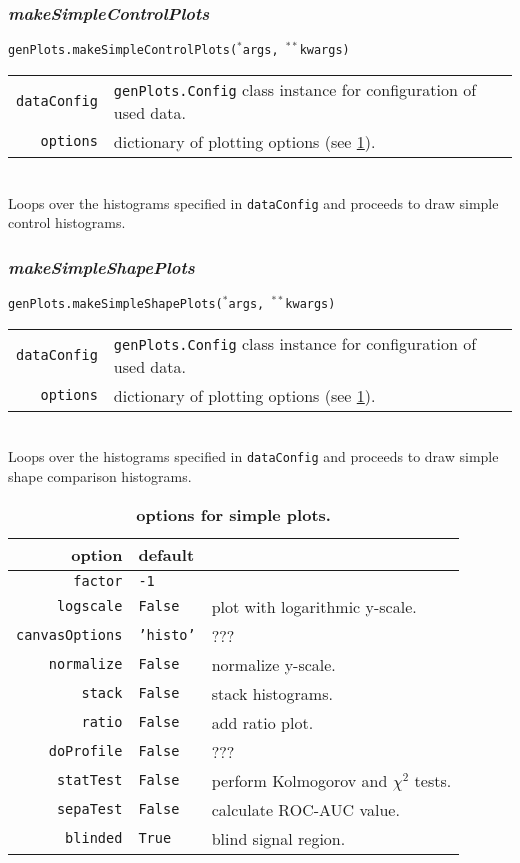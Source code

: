 \documentclass[12pt, a4paper]{article}
\newcommand{\args}{$^*$args}
\newcommand{\kwargs}{$^{**}$kwargs}
\begin{document}
\subsubsection{\textit{makeSimpleControlPlots}}
\texttt{genPlots.makeSimpleControlPlots(\args, \kwargs)}\\
\begin{tabular}{r|l}
\hline
\texttt{dataConfig}	&	\texttt{genPlots.Config} class instance for configuration of used data.\\
\texttt{options}	&	dictionary of plotting options (see \ref{plotoptionstable}).\\
\hline
\end{tabular}
\\
Loops over the histograms specified in \texttt{dataConfig} and proceeds to draw simple control histograms.

\subsubsection{\textit{makeSimpleShapePlots}}
\texttt{genPlots.makeSimpleShapePlots(\args, \kwargs)}\\
\begin{tabular}{r|l}
\hline
\texttt{dataConfig}	&	\texttt{genPlots.Config} class instance for configuration of used data.\\
\texttt{options}	&	dictionary of plotting options (see \ref{plotoptionstable}).\\
\hline
\end{tabular}
\\
Loops over the histograms specified in \texttt{dataConfig} and proceeds to draw simple shape comparison histograms.


\begin{table}
\caption{\textbf{options for simple plots.}}\label{plotoptionstable}
\begin{tabular}{r|ll}
option					& default			& 	\\
\hline
\texttt{factor}			& \texttt{-1}		&  	\\
\texttt{logscale}		& \texttt{False}	&	plot with logarithmic y-scale.\\
\texttt{canvasOptions}	& \texttt{'histo'}	&	???\\
\texttt{normalize}		& \texttt{False}	&	normalize y-scale.\\
\texttt{stack}			& \texttt{False}	&	stack histograms.\\
\texttt{ratio}			& \texttt{False}	&	add ratio plot.\\
\texttt{doProfile}		& \texttt{False}	&	???\\
\texttt{statTest}		& \texttt{False}	&	perform Kolmogorov and $\chi^2$ tests.\\
\texttt{sepaTest}		& \texttt{False}	&	calculate ROC-AUC value.\\
\texttt{blinded}		& \texttt{True}		&	blind signal region.\\

\end{tabular}
\end{table}
\end{document}

